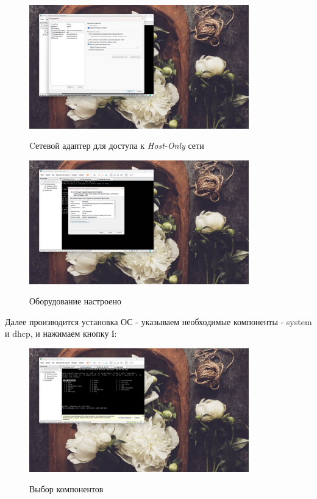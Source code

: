 \documentclass[a4paper]{article}
\begin{document}
  \begin{figure}[H]
    \centering
    \includegraphics[width=0.85\textwidth]{06_00 (83)}
    \label{img:83}
    \caption{Cетевой адаптер для доступа к \textit{Host-Only} сети}
  \end{figure}
  
  \begin{figure}[H]
    \centering
    \includegraphics[width=0.85\textwidth]{06_00 (84)}
    \label{img:84}
    \caption{Оборудование настроено}
  \end{figure}
  
  Далее производится установка ОС - указываем необходимые компоненты - system и dhcp, и нажимаем кнопку \textbf{i}:

  \begin{figure}[H]
    \centering
    \includegraphics[width=0.85\textwidth]{06_00 (85)}
    \label{img:85}
    \caption{Выбор компонентов}
  \end{figure}
  
\end{document}
